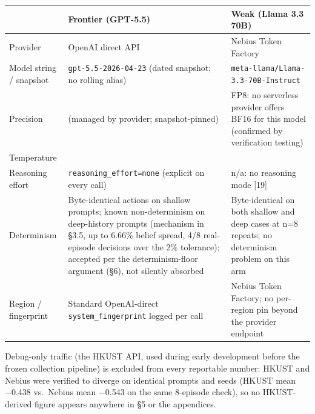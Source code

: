 \documentclass[
  11pt,
]{article}
\newcounter{none} %
\begin{document}
{\def\LTcaptype{none} %
\begin{longtable}[]{@{}
  >{\raggedright\arraybackslash}p{}
  >{\raggedright\arraybackslash}p{}
  >{\raggedright\arraybackslash}p{}@{}}
\toprule\noalign{}
\begin{minipage}[b]{\linewidth}\raggedright
\end{minipage} & \begin{minipage}[b]{\linewidth}\raggedright
Frontier (GPT-5.5)
\end{minipage} & \begin{minipage}[b]{\linewidth}\raggedright
Weak (Llama 3.3 70B)
\end{minipage} \\
\midrule\noalign{}
\endhead
\bottomrule\noalign{}
\endlastfoot
Provider & OpenAI direct API & Nebius Token Factory \\
Model string / snapshot & \texttt{gpt-5.5-2026-04-23} (dated snapshot; no rolling alias) & \texttt{meta-llama/Llama-3.3-70B-Instruct} \\
Precision & (managed by provider; snapshot-pinned) & FP8: no serverless provider offers BF16 for this model (confirmed by verification testing) \\
Temperature & 0 & 0 \\
Reasoning effort & \texttt{reasoning\_effort=\textquotesingle{}none\textquotesingle{}} (explicit on every call) & n/a: no reasoning mode {[}19{]} \\
Determinism & Byte-identical actions on shallow prompts; known non-determinism on deep-history prompts (mechanism in §3.5, up to 6.66\% belief spread, 4/8 real-episode decisions over the 2\% tolerance); accepted per the determinism-floor argument (§6), not silently absorbed & Byte-identical on both shallow and deep cases at n=8 repeats; no determinism problem on this arm \\
Region / fingerprint & Standard OpenAI-direct \texttt{system\_fingerprint} logged per call & Nebius Token Factory; no per-region pin beyond the provider endpoint \\
\end{longtable}
}

Debug-only traffic (the HKUST API, used during early development before the frozen collection pipeline) is excluded from every reportable number: HKUST and Nebius were verified to diverge on identical prompts and seeds (HKUST mean −0.438 vs.~Nebius mean −0.543 on the same 8-episode check), so no HKUST-derived figure appears anywhere in §5 or the appendices.
\end{document}
